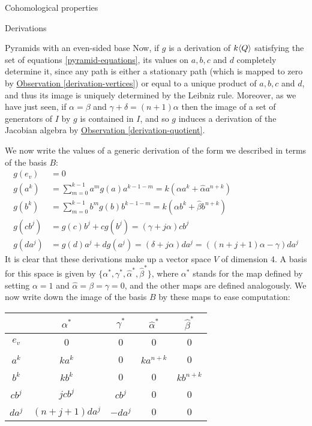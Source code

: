 \begin{chapter}{Cohomological properties}
\begin{section}{Derivations}
\begin{subsection}{Pyramids with an even-sided base}
Now, if $g$ is a derivation of $k\langle Q\rangle$ satisfying the set of equations \eqref{pyramid-equations}, its values on $a,b,c$ and $d$ completely determine it, since any path is either a stationary path (which is mapped to zero by \hyperref[derivation-vertices]{Observation \ref*{derivation-vertices}}) or equal to a unique product of $a,b,c$ and $d$, and thus its image is uniquely determined by the Leibniz rule. Moreover, as we have just seen, if $\alpha=\beta$ and $\gamma+\delta=(n+1)\alpha$ then the image of a set of generators of $I$ by $g$ is contained in $I$, and so $g$ induces a derivation of the Jacobian algebra  by \hyperref[derivation-quotient]{Observation \ref*{derivation-quotient}}.

We now write the values of a generic derivation of the form we described in terms of the basis $B$:
\begin{align*}
g(e_v) &= 0\\
g(a^k) &=\sum_{m=0}^{k-1} a^mg(a)a^{k-1-m}=k(\alpha a^k + \hat\alpha a^{n+k}) \\
g(b^k) &=\sum_{m=0}^{k-1}b^mg(b)b^{k-1-m}=k(\alpha b^k + \hat\beta b^{n+k})\\
g(cb^j) &= g(c)b^j + cg(b^j) = (\gamma+j\alpha) cb^j \\
g(da^j) &= g(d)a^j + dg(a^j) = (\delta+j\alpha) da^j = \left((n+j+1)\alpha-\gamma\right)da^j
\end{align*}
It is clear that these derivations make up a vector space $V$ of dimension 4. A basis for this space is given by $\{\alpha^*, \gamma^*, \hat\alpha^*, \hat\beta^*\}$, where $\alpha^*$ stands for the map defined by setting $\alpha=1$ and $\hat\alpha=\beta=\gamma=0$, and the other maps are defined analogously. We now write down the image of the basis $B$ by these maps to ease computation:
\begin{center}
\begin{tabular}{ c | c | c | c | c }
	& 	$\alpha^*$ 		& $\gamma^*$	& $\hat\alpha^*$	& $\hat\beta^*$	\\
\hline
$e_v$ & 	0 			& 0 			& 0			& 0 \\
$a^k$ & 	$ka^k$ 		& 0			& $ka^{n+k}$	& 0 \\
$b^k$ & 	$kb^k$ 		& 0			& 0			& $kb^{n+k}$ \\
$cb^j$ & 	$jcb^j$ 		& $cb^j$		& 0			& 0 \\
$da^j$ & 	$(n+j+1)da^j$	& $-da^j$		& 0			& 0 
\end{tabular}
\end{center}


\end{subsection}
\end{section}
\end{chapter}
